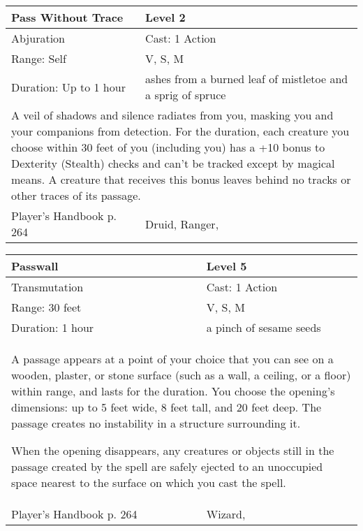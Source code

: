 \documentclass[11pt]{report}
\begin{document}
\begin{table}[H]
	\begin{tabular}{||p{6cm}|p{6cm}||}
		\hline\hline
		\bf{Pass Without Trace} & Level 2\\ \hline
		Abjuration & Cast: 1 Action\\ \hline
		Range: Self & V, S, M\\ \hline
		Duration: Up to 1 hour & ashes from a burned leaf of mistletoe and a sprig of spruce\\ \hline
		\multicolumn{2}{||p{12cm}||}{A veil of shadows and silence radiates from you, masking you and your companions from detection.
For the duration, each creature you choose within 30 feet of you (including you) has a +10 bonus to Dexterity (Stealth) checks and can’t be tracked except by magical means. A creature that receives this bonus leaves behind no tracks or other traces of its passage.}\\ \hline
Player's Handbook p. 264 & Druid, Ranger, \\ \hline\hline
	\end{tabular}
\end{table}

\begin{table}[H]
	\begin{tabular}{||p{6cm}|p{6cm}||}
		\hline\hline
		\bf{Passwall} & Level 5\\ \hline
		Transmutation & Cast: 1 Action\\ \hline
		Range: 30 feet & V, S, M\\ \hline
		Duration: 1 hour & a pinch of sesame seeds\\ \hline
		\multicolumn{2}{||p{12cm}||}{A passage appears at a point of your choice that you can see on a wooden, plaster, or stone surface (such as a wall, a ceiling, or a floor) within range, and lasts for the duration. You choose the opening’s dimensions: up to 5 feet wide, 8 feet tall, and 20 feet deep. The passage creates no instability in a structure surrounding it.

When the opening disappears, any creatures or objects still in the passage created by the spell are safely ejected to an unoccupied space nearest to the surface on which you cast the spell.}\\ \hline
Player's Handbook p. 264 & Wizard, \\ \hline\hline
	\end{tabular}
\end{table}
\end{document}

